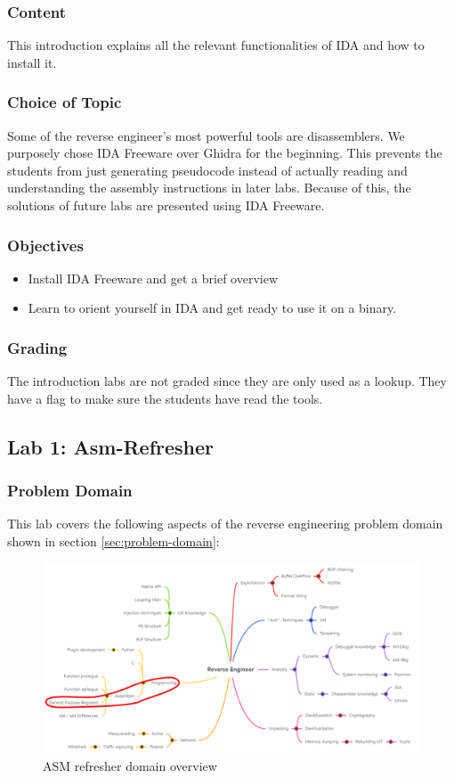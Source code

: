 \subsubsection*{Content}
This introduction explains all the relevant functionalities of IDA and how to install it.
\subsubsection*{Choice of Topic}
Some of the reverse engineer's most powerful tools are disassemblers. We purposely chose IDA Freeware over Ghidra for the beginning. This prevents the students from just generating pseudocode instead of actually reading and understanding the assembly instructions in later labs. Because of this, the solutions of future labs are presented using IDA Freeware.
\subsubsection*{Objectives}
\begin{itemize}
    \item Install IDA Freeware and get a brief overview
    \item Learn to orient yourself in IDA and get ready to use it on a binary.
\end{itemize}
\subsubsection*{Grading}
The introduction labs are not graded since they are only used as a lookup. They have a flag to make sure the students have read the tools.
\pagebreak

\subsection{Lab 1: Asm-Refresher}
\subsubsection*{Problem Domain}
This lab covers the following aspects of the reverse engineering problem domain shown in section \ref{sec:problem-domain}:
\vspace{-2ex}
\begin{figure}[H]
    \includegraphics[width=\textwidth]{resources/ASM-overview-light.png}
    \caption{ASM refresher domain overview}
    \label{fig:refresher-overview}
\end{figure}
